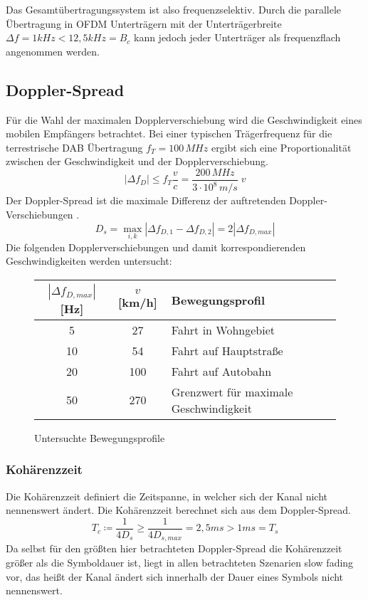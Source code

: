 Das Gesamtübertragungssystem ist also frequenzselektiv. Durch die parallele Übertragung in OFDM Unterträgern mit der Unterträgerbreite $\Delta f = 1 kHz < 12,5 kHz = B_c$ kann jedoch jeder Unterträger als frequenzflach angenommen werden.

\subsection{Doppler-Spread}
Für die Wahl der maximalen Dopplerverschiebung wird die Geschwindigkeit eines mobilen Empfängers betrachtet. Bei einer typischen Trägerfrequenz für die terrestrische DAB Übertragung $f_T=100\, MHz$ ergibt sich eine Proportionalität zwischen der Geschwindigkeit und der Dopplerverschiebung.
\begin{equation}
|\Delta f_{D}| \leq f_T \frac{v}{c} = \frac{200\, MHz}{3\cdot 10^8\, m/s}\; v
\end{equation}
Der Doppler-Spread ist die maximale Differenz der auftretenden Doppler-Verschiebungen \cite{proakis}.
\begin{equation}
D_s = \max_{i,k} |\Delta f_{D,1} - \Delta f_{D,2}| = 2 |\Delta f_{D,max}|
\end{equation}
Die folgenden Dopplerverschiebungen und damit korrespondierenden Geschwindigkeiten werden untersucht:

\begin{figure} [h]
\begin{center}
\begin{tabular}{c | c | l}
$|\Delta f_{D,max}|$ [Hz] & $v$ [km/h] & Bewegungsprofil \\
\hline
5 & 27 & Fahrt in Wohngebiet \\
10 & 54 & Fahrt auf Hauptstraße \\
20 & 100 & Fahrt auf Autobahn \\
50 & 270 & Grenzwert für maximale Geschwindigkeit
\end{tabular}
\caption{Untersuchte Bewegungsprofile}
\label{tab:doppler_werte}
\end{center}
\end{figure}

\subsubsection{Kohärenzzeit}
Die Kohärenzzeit definiert die Zeitspanne, in welcher sich der Kanal nicht nennenswert ändert. Die Kohärenzzeit berechnet sich aus dem Doppler-Spread.
\begin{equation}
T_{c} \coloneqq \frac{1}{4 D_s} \geq \frac{1}{4 D_{s,max}} = 2,5 ms > 1 ms = T_s
\end{equation}
Da selbst für den größten hier betrachteten Doppler-Spread die Kohärenzzeit größer als die Symboldauer ist, liegt in allen betrachteten Szenarien slow fading vor, das heißt der Kanal ändert sich innerhalb der Dauer eines Symbols nicht nennenswert.

